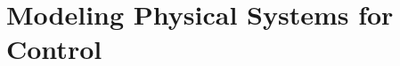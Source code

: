 \documentclass[11pt,letterpaper]{book}
\begin{document}
\frontmatter
\titlepage


\mainmatter

\chapter{Modeling Physical Systems for Control}


\backmatter
\end{document}
